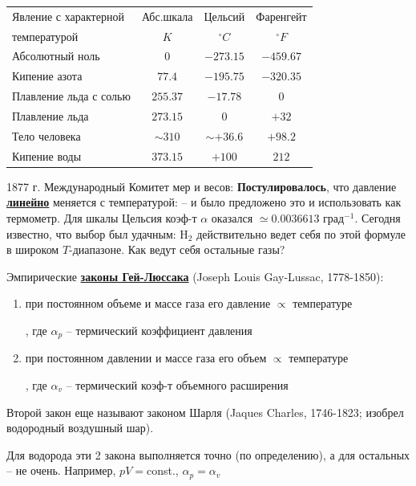 \documentclass[12pt,epsfig,color,russian]{article}
\begin{document}
\begin{center}
\begin{tabular}{|l||c|c|c|}\hline
Явление с характерной  & Абс.шкала &  Цельсий     & Фаренгейт  \\
 температурой          &   $K$     & $^\circ C$   & $^\circ F$ \\ \hline\hline
Абсолютный ноль        & $  0   $    & $-273.15 $   & $-459.67$    \\ \hline
Кипение азота          & $ 77.4 $    & $-195.75 $   & $-320.35$    \\ \hline
Плавление льда с солью & $255.37$    & $ -17.78 $   & $   0   $    \\ \hline
Плавление льда         & $273.15$    & $   0    $   & $ +32   $    \\ \hline
Тело человека          & $\sim310$   & $\sim+36.6$   & $ +98.2 $    \\ \hline
Кипение воды           & $373.15$    & $+100    $   & $  212  $    \\ \hline
\end{tabular}
\end{center}

1877 г. Международный Комитет мер и весов: {\bf Постулировалось}, что давление \underline{\bf линейно} меняется с температурой:
 -- и было предложено это и использовать как термометр. Для шкалы Цельсия коэф-т $\alpha$ оказался $\simeq0.0036613$ град$^{-1}$. Сегодня известно, что выбор был удачным: H$_2$ действительно ведет себя по этой формуле в широком $T$-диапазоне.  Как ведут себя остальные газы?

Эмпирические \underline{\bf законы Гей-Люссака} (Joseph Louis Gay-Lussac, 1778-1850):
\begin{enumerate}
\item при постоянном объеме и массе газа его давление $\propto$ температуре

      , где $\alpha_p$ -- термический коэффициент давления
\item при постоянном давлении и массе газа его объем $\propto$ температуре

      , где  $\alpha_v$ -- термический коэф-т объемного расширения
\end{enumerate}
Второй закон еще называют законом Шарля (Jaques Charles, 1746-1823; изобрел водородный воздушный шар).


Для водорода эти 2 закона выполняется точно (по определению), а для остальных -- не очень. Например, $pV=$const., $\alpha_p=\alpha_v$\\
\end{document}

